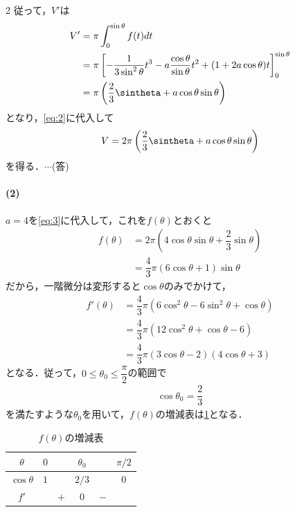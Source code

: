 \documentclass[../../main.tex]{subfiles}
\begin{document}
\begin{multicols}{2}
従って，$V'$は
\begin{align}
V'
& = \pi \int_0^{\sin\theta} f(t) dt                                                                                      \\
& = \pi\left[ -\dfrac{1}{3\sin^2\theta}t^3 - a\dfrac{\cos\theta}{\sin\theta}t^2 + (1+2a\cos\theta)t \right]_0^{\sin\theta} \\
& = \pi\left(\dfrac{2}{3}\sintheta + a\cos\theta\sin\theta\right)
\end{align}
となり，\cref{eq:2}に代入して
\begin{align}
V = 2\pi\left(\dfrac{2}{3}\sintheta + a\cos\theta\sin\theta\right) \label{eq:3}
\end{align}
を得る．$\cdots$(答)

\paragraph{(2)}
$a=4$を\cref{eq:3}に代入して，これを$f(\theta)$とおくと
\begin{align}
f(\theta)
& = 2\pi(4\cos\theta\sin\theta+\dfrac{2}{3}\sin\theta) \\
& = \dfrac{4}{3}\pi (6\cos\theta+1)\sin\theta
\end{align}
だから，一階微分は変形すると$\cos\theta$のみでかけて，
\begin{align}
f'(\theta)
& = \dfrac{4}{3}\pi (6\cos^2\theta - 6\sin^2\theta + \cos\theta)         \\
& = \dfrac{4}{3}\pi(12\cos^2\theta+\cos\theta-6)                         \\
& = \dfrac{4}{3}\pi \left(3\cos\theta-2\right)\left(4\cos\theta+3\right)
\end{align}
となる．従って，$0 \le \theta_0 \le \dfrac{\pi}{2}$の範囲で
\begin{align}
\cos \theta_0 = \dfrac{2}{3}
\end{align}
を満たすような$\theta_0$を用いて，$f(\theta)$の増減表は\cref{2006-2:table:1}となる．
\begin{table}[H]
\centering
\caption{$f(\theta)$の増減表}
\label{2006-2:table:1}
\begin{tabular}{|c||c|c|c|c|c|} \hline
  $\theta$     & $0$ &            & $\theta_0$ &            & $\pi/2$ \\ \hline
  $\cos\theta$ & $1$ &            & $2/3$      &            & $0$     \\ \hline
  $f'$         &     & $+$        & $0$        & $-$        &         \\ \hline

\end{tabular}
\end{table}
\end{multicols}
\end{document}
